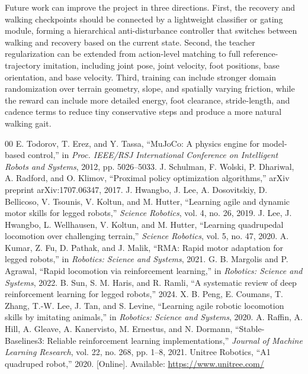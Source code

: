 \documentclass[conference]{IEEEtran}
\begin{document}
Future work can improve the project in three directions. First, the recovery and walking checkpoints should be connected by a lightweight classifier or gating module, forming a hierarchical anti-disturbance controller that switches between walking and recovery based on the current state. Second, the teacher regularization can be extended from action-level matching to full reference-trajectory imitation, including joint pose, joint velocity, foot positions, base orientation, and base velocity. Third, training can include stronger domain randomization over terrain geometry, slope, and spatially varying friction, while the reward can include more detailed energy, foot clearance, stride-length, and cadence terms to reduce tiny conservative steps and produce a more natural walking gait.

\begin{thebibliography}{00}
 E. Todorov, T. Erez, and Y. Tassa, ``MuJoCo: A physics engine for model-based control,'' in \emph{Proc. IEEE/RSJ International Conference on Intelligent Robots and Systems}, 2012, pp. 5026--5033.
 J. Schulman, F. Wolski, P. Dhariwal, A. Radford, and O. Klimov, ``Proximal policy optimization algorithms,'' arXiv preprint arXiv:1707.06347, 2017.
 J. Hwangbo, J. Lee, A. Dosovitskiy, D. Bellicoso, V. Tsounis, V. Koltun, and M. Hutter, ``Learning agile and dynamic motor skills for legged robots,'' \emph{Science Robotics}, vol. 4, no. 26, 2019.
 J. Lee, J. Hwangbo, L. Wellhausen, V. Koltun, and M. Hutter, ``Learning quadrupedal locomotion over challenging terrain,'' \emph{Science Robotics}, vol. 5, no. 47, 2020.
 A. Kumar, Z. Fu, D. Pathak, and J. Malik, ``RMA: Rapid motor adaptation for legged robots,'' in \emph{Robotics: Science and Systems}, 2021.
 G. B. Margolis and P. Agrawal, ``Rapid locomotion via reinforcement learning,'' in \emph{Robotics: Science and Systems}, 2022.
 B. Sun, S. M. Haris, and R. Ramli, ``A systematic review of deep reinforcement learning for legged robots,'' 2024.
 X. B. Peng, E. Coumans, T. Zhang, T.-W. Lee, J. Tan, and S. Levine, ``Learning agile robotic locomotion skills by imitating animals,'' in \emph{Robotics: Science and Systems}, 2020.
 A. Raffin, A. Hill, A. Gleave, A. Kanervisto, M. Ernestus, and N. Dormann, ``Stable-Baselines3: Reliable reinforcement learning implementations,'' \emph{Journal of Machine Learning Research}, vol. 22, no. 268, pp. 1--8, 2021.
 Unitree Robotics, ``A1 quadruped robot,'' 2020. [Online]. Available: \url{https://www.unitree.com/}
\end{thebibliography}
\end{document}
